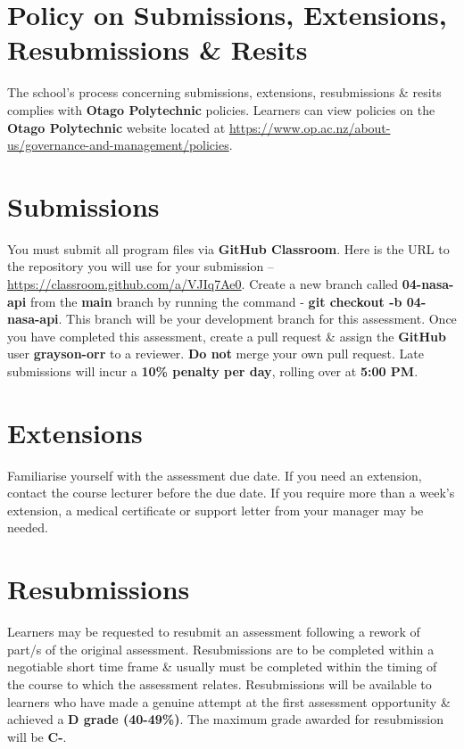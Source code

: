 \documentclass{article}
\begin{document}
\section*{Policy on Submissions, Extensions, Resubmissions \& Resits}
The school's process concerning submissions, extensions, resubmissions \& resits complies with \textbf{Otago Polytechnic} policies. Learners can view policies on the \textbf{Otago Polytechnic} website located at \href{https://www.op.ac.nz/about-us/governance-and-management/policies}{https://www.op.ac.nz/about-us/governance-and-management/policies}.

\section*{Submissions}
You must submit all program files via \textbf{GitHub Classroom}. Here is the URL to the repository you will use for your submission – \href{https://classroom.github.com/a/VJIq7Ae0}{https://classroom.github.com/a/VJIq7Ae0}. Create a new branch called  \textbf{04-nasa-api} from the \textbf{main} branch by running the command - \textbf{git checkout -b 04-nasa-api}. This branch will be your development branch for this assessment. Once you have completed this assessment, create a pull request \& assign the \textbf{GitHub} user \textbf{grayson-orr} to a reviewer. \textbf{Do not} merge your own pull request. Late submissions will incur a \textbf{10\% penalty per day}, rolling over at \textbf{5:00 PM}.

\section*{Extensions}
Familiarise yourself with the assessment due date. If you need an extension, contact the course lecturer before the due date. If you require more than a week's extension, a medical certificate or support letter from your manager may be needed.

\section*{Resubmissions}
Learners may be requested to resubmit an assessment following a rework of part/s of the original assessment. Resubmissions are to be completed within a negotiable short time frame \& usually must be completed within the timing of the course to which the assessment relates. Resubmissions will be available to learners who have made a genuine attempt at the first assessment opportunity \& achieved a \textbf{D grade (40-49\%)}. The maximum grade awarded for resubmission will be \textbf{C-}.
\end{document}
